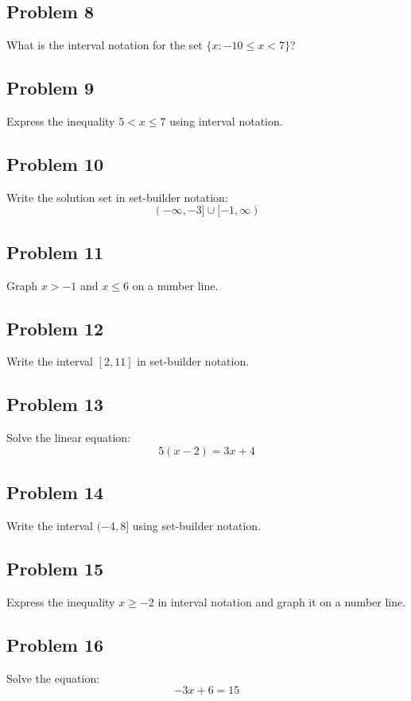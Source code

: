\documentclass[12pt]{article}
\begin{document}
\subsection*{Problem 8}
What is the interval notation for the set \(\{x : -10 \leq x < 7\}\)?

\subsection*{Problem 9}
Express the inequality \(5 < x \leq 7\) using interval notation.

\subsection*{Problem 10}
Write the solution set in set-builder notation:  
\[
(-\infty, -3] \cup [-1, \infty)
\]

\subsection*{Problem 11}
Graph \(x > -1\) and \(x \leq 6\) on a number line.

\subsection*{Problem 12}
Write the interval \([2, 11]\) in set-builder notation.

\subsection*{Problem 13}
Solve the linear equation:  
\[
5(x - 2) = 3x + 4
\]

\subsection*{Problem 14}
Write the interval \((-4, 8]\) using set-builder notation.

\subsection*{Problem 15}
Express the inequality \(x \geq -2\) in interval notation and graph it on a number line.

\subsection*{Problem 16}
Solve the equation:  
\[
-3x + 6 = 15
\]
\end{document}
